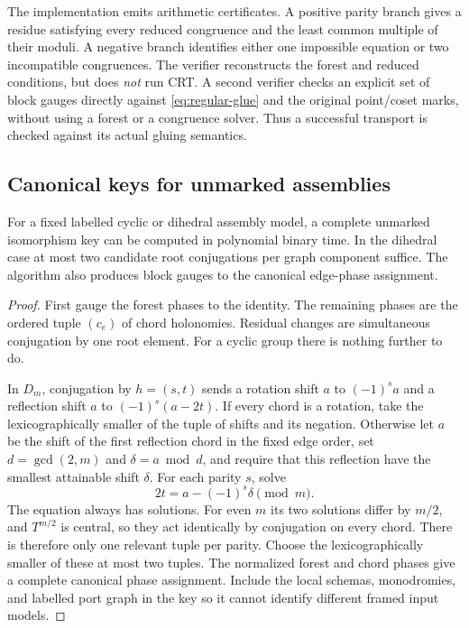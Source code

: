 The implementation emits arithmetic certificates.  A positive parity
branch gives a residue satisfying every reduced congruence and the least
common multiple of their moduli.  A negative branch identifies either
one impossible equation or two incompatible congruences.  The verifier
reconstructs the forest and reduced conditions, but does \emph{not} run
CRT.  A second verifier checks an explicit set of block gauges directly
against \eqref{eq:regular-glue} and the original point/coset marks, without
using a forest or a congruence solver.  Thus a successful transport is
checked against its actual gluing semantics.

\subsection{Canonical keys for unmarked assemblies}

\begin{theorem}
For a fixed labelled cyclic or dihedral assembly model, a complete
unmarked isomorphism key can be computed in polynomial binary time.
In the dihedral case at most two candidate root conjugations per graph
component suffice.  The algorithm also produces block gauges to the
canonical edge-phase assignment.
\end{theorem}
\begin{proof}
First gauge the forest phases to the identity.  The remaining phases are
the ordered tuple $(c_e)$ of chord holonomies.  Residual changes are
simultaneous conjugation by one root element.
For a cyclic group there is nothing further to do.

In $D_m$, conjugation by $h=(s,t)$ sends a rotation shift $a$ to
$(-1)^sa$ and a reflection shift $a$ to $(-1)^s(a-2t)$.
If every chord is a rotation, take the lexicographically smaller of
the tuple of shifts and its negation.
Otherwise let $a$ be the shift of the first reflection chord in the fixed
edge order, set $d=\gcd(2,m)$ and $\delta=a\bmod d$, and require that this
reflection have the smallest attainable shift $\delta$.  For each parity
$s$, solve
\[
 2t=a-(-1)^s\delta\pmod m.
\]
The equation always has solutions.  For even $m$ its two solutions differ
by $m/2$, and $T^{m/2}$ is central, so they act identically by conjugation
on every chord.  There is therefore only one relevant tuple per parity.
Choose the lexicographically smaller of these at most two tuples.
The normalized forest and chord phases give a complete canonical phase
assignment.  Include the local schemas, monodromies, and labelled port
graph in the key so it cannot identify different framed input models.
\end{proof}


